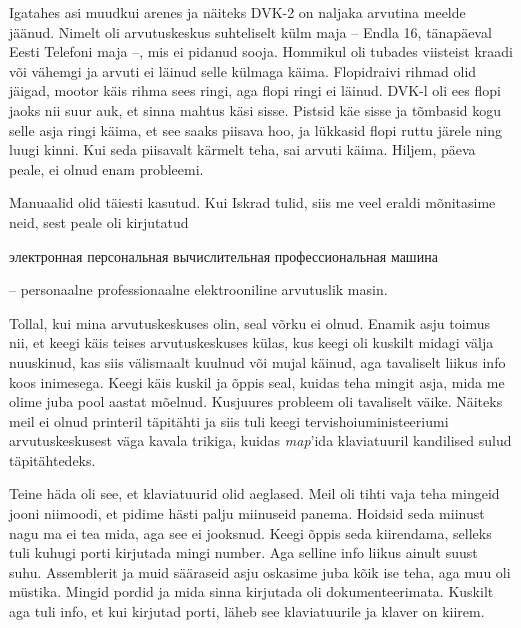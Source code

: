 Igatahes asi muudkui arenes ja näiteks DVK-2 on naljaka arvutina 
meelde jäänud. Nimelt oli arvutuskeskus suhteliselt külm maja -- Endla 16, 
tänapäeval Eesti Telefoni maja --, mis ei pidanud sooja. Hommikul oli tubades viisteist kraadi või 
vähemgi ja arvuti ei läinud selle külmaga käima. Flopidraivi rihmad olid 
jäigad, mootor käis rihma sees ringi, aga flopi ringi ei läinud. 
DVK-l oli ees flopi jaoks nii suur auk, et sinna mahtus käsi sisse. 
Pistsid käe sisse ja tõmbasid kogu selle asja ringi käima, et see saaks piisava hoo, 
ja lükkasid flopi ruttu järele ning luugi kinni. Kui seda piisavalt kärmelt 
teha, sai arvuti käima. Hiljem, päeva peale, ei olnud enam probleemi. 


Manuaalid olid täiesti kasutud. Kui Iskrad 
tulid, siis me veel eraldi mõnitasime neid, sest peale oli kirjutatud 
\begin{russian}электронная персональная вычислительная профессиональная 
машина\end{russian} -- personaalne professionaalne elektrooniline arvutuslik 
masin. 


Tollal, kui mina arvutuskeskuses olin, seal võrku ei 
olnud. Enamik asju toimus nii, et keegi käis teises 
arvutuskeskuses külas, kus keegi oli kuskilt midagi välja nuuskinud, kas siis välismaalt kuulnud või mujal käinud, aga tavaliselt liikus info koos 
inimesega. Keegi käis kuskil ja õppis seal, kuidas teha 
mingit asja, mida me olime juba pool aastat mõelnud. Kusjuures probleem oli 
tavaliselt väike. Näiteks meil ei olnud printeril täpitähti ja siis tuli keegi tervishoiuministeeriumi arvutuskeskusest 
väga kavala trikiga, kuidas \emph{map}'ida klaviatuuril kandilised sulud 
täpitähtedeks.

Teine häda oli see, et klaviatuurid olid aeglased. Meil oli tihti vaja teha
mingeid jooni niimoodi, et pidime hästi palju miinuseid panema. Hoidsid seda miinust 
nagu ma ei tea mida, aga see ei jooksnud. Keegi õppis seda 
kiirendama, selleks tuli kuhugi porti kirjutada mingi number. Aga selline info 
liikus ainult suust suhu. Assemblerit ja muid sääraseid asju oskasime juba 
kõik ise teha, aga muu oli müstika. Mingid pordid ja mida sinna 
kirjutada oli dokumenteerimata. Kuskilt aga tuli info, et kui kirjutad porti, läheb see klaviatuurile ja klaver on kiirem. 


